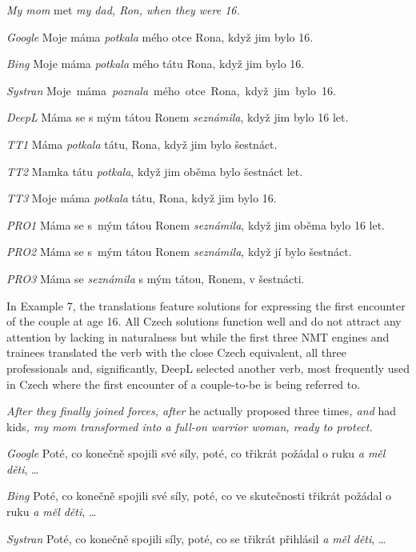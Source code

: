 \documentclass[output=paper]{langscibook}
\begin{document}
\ea \label{ex:kamenicka:3}

\textit{My mom} met \textit{my dad, Ron, when they were 16.}

\textit{Google} Moje máma \textit{potkala} mého otce Rona, když jim bylo 16.

\textit{Bing} Moje máma \textit{potkala} mého tátu Rona, když jim bylo 16.

\textit{Systran} Moje~máma~\textit{poznala}~mého~otce~Rona,~když~jim~bylo~16.~

\textit{DeepL} Máma se s mým tátou Ronem \textit{seznámila}, když jim bylo 16 let.

\textit{TT1} Máma \textit{potkala} tátu, Rona, když jim bylo šestnáct.

\textit{TT2} Mamka tátu \textit{potkala}, když jim oběma bylo šestnáct let.

\textit{TT3} Moje máma \textit{potkala} tátu, Rona, když jim bylo 16.

\textit{PRO1} Máma se s~mým tátou Ronem \textit{seznámila}, když jim oběma bylo 16 let.

\textit{PRO2} Máma se s~mým tátou Ronem \textit{seznámila}, když jí bylo šestnáct.

\textit{PRO3} Máma se \textit{seznámila} s mým tátou, Ronem, v šestnácti.

\z
In Example 7, the translations feature solutions for expressing the first encounter of the couple at age 16. All Czech solutions function well and do not attract any attention by lacking in naturalness but while the first three NMT engines and trainees translated the verb with the close Czech equivalent, all three professionals and, significantly, DeepL selected another verb, most frequently used in Czech where the first encounter of a couple-to-be is being referred to.

\ea \label{ex:kamenicka:4}

\textit{After they finally joined forces, after} he actually proposed three times\textit{, and} had kids\textit{, my mom transformed into a full-on warrior woman, ready to protect.}

\textit{Google} Poté, co konečně spojili své síly, poté, co třikrát požádal o ruku \textit{a měl děti}, …

\textit{Bing} Poté, co konečně spojili své síly, poté, co ve skutečnosti třikrát požádal o ruku \textit{a měl děti}, …

\textit{Systran} Poté, co konečně spojili síly, poté, co se třikrát přihlásil \textit{a měl děti}, …
\end{document}

